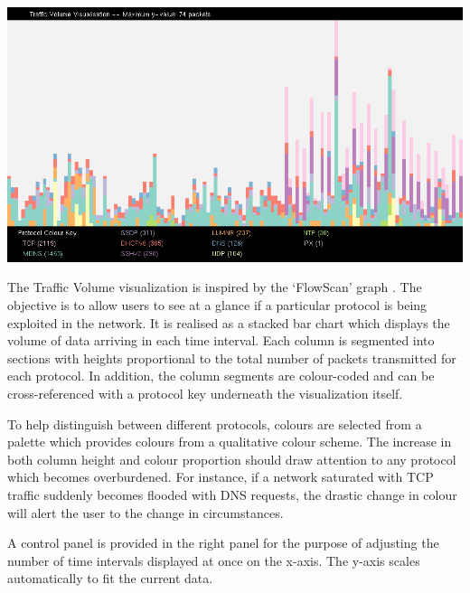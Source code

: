 \includegraphics[width=\linewidth]{materials/traffic-volume.png}

The Traffic Volume visualization is inspired by the `FlowScan' graph
\cite{plonka2000flowscan}. The objective is to allow users to see at a glance
if a particular protocol is being exploited in the network. It is realised as a
stacked bar chart which displays the volume of data arriving in each time
interval. Each column is segmented into sections with heights proportional to
the total number of packets transmitted for each protocol.
In addition, the column segments are colour-coded and can be cross-referenced
with a protocol key underneath the visualization itself.

To help distinguish between different protocols, colours are selected from a
palette which provides colours from a qualitative colour scheme.
The increase in both column height and colour proportion should draw attention
to any protocol which becomes overburdened. For instance, if a network
saturated with TCP traffic suddenly becomes flooded with DNS requests, the
drastic change in colour will alert the user to the change in circumstances.

A control panel is provided in the right panel for the purpose of adjusting the
number of time intervals displayed at once on the x-axis. The y-axis scales
automatically to fit the current data.

